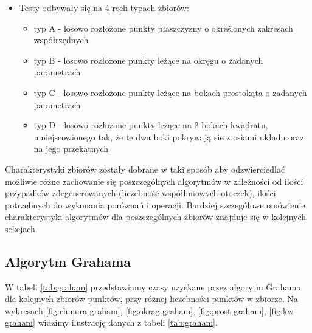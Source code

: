 \documentclass[11pt]{article}
\theoremstyle{remark} \newtheorem{definition}{def.}
\theoremstyle{definition} \newtheorem{twierdzenie}{tw.}
\begin{document}
\begin{itemize}
    \item   Testy odbywały się na 4-rech typach zbiorów:
        \begin{itemize}
            \item   typ A - losowo rozłożone punkty płaszczyzny o określonych zakresach współrzędnych
            \item   typ B - losowo rozłożone punkty leżące na okręgu o zadanych parametrach
            \item   typ C - losowo rozłożone punkty leżące na bokach prostokąta o zadanych parametrach
            \item   typ D - losowo rozłożone punkty leżące na 2 bokach kwadratu, umiejscowionego tak,
                    że te dwa boki pokrywają sie z osiami układu oraz na jego przekątnych \\
        \end{itemize}
\end{itemize}


Charakterystyki zbiorów zostały dobrane w taki sposób aby odzwierciedlać możliwie różne zachowanie się  poszczególnych algorytmów w zależności od ilości przypadków zdegenerowanych (liczebność 
współliniowych otoczek), ilości potrzebnych do wykonania porównań i operacji. Bardziej szczegółowe omówienie charakterystyki algorytmów dla poszczególnych zbiorów znajduje się w kolejnych sekcjach. 



\subsection{Algorytm Grahama}

W tabeli \ref{tab:graham} przedstawiamy czasy uzyskane przez algorytm Grahama dla kolejnych zbiorów punktów, przy różnej liczebności punktów w zbiorze. Na wykresach \ref{fig:chmura-graham}, 
\ref{fig:okrag-graham}, \ref{fig:prost-graham}, \ref{fig:kw-graham} widzimy ilustrację danych z tabeli \ref{tab:graham}.
\end{document}
